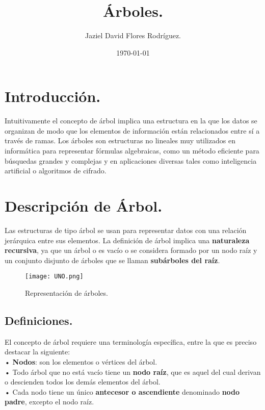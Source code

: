 \documentclass[12pt]{article}
\author{Jaziel David Flores Rodríguez.}
\date{\today}
\title{Árboles.}
\begin{document}
\maketitle
\section{Introducción.}

Intuitivamente el concepto de árbol implica una estructura en la que los datos se organizan de modo que los elementos de información están relacionados entre sí a través de ramas. Los árboles son estructuras no lineales muy utilizados en informática para representar fórmulas algebraicas, como un método eficiente para búsquedas grandes y complejas y en aplicaciones diversas tales como inteligencia artificial o algoritmos de cifrado. 
\section{Descripción de Árbol.}

Las estructuras de tipo árbol se usan para representar datos con una relación jerárquica entre sus elementos. La definición de árbol implica una \textbf{naturaleza recursiva}, ya que un árbol o es vacío o se considera formado por un nodo raíz y un conjunto disjunto de árboles que se llaman \textbf{subárboles del raíz}. \\

\begin{figure}[h]
\centering
   \texttt{[image: UNO.png]}
	\caption{Representación de árboles.}
\end{figure}

\pagebreak

\subsection{Definiciones.}

El concepto de árbol requiere una terminología específica, entre la que es preciso destacar la siguiente:\\

• \textbf{Nodos}: son los elementos o vértices del árbol.\\

• Todo árbol que no está vacío tiene un \textbf{nodo raíz}, que es aquel del cual derivan o descienden todos los demás elementos del árbol.\\ 

• Cada nodo tiene un único \textbf{antecesor o ascendiente} denominado \textbf{nodo padre}, excepto el nodo raíz. \\ 
\end{document}
